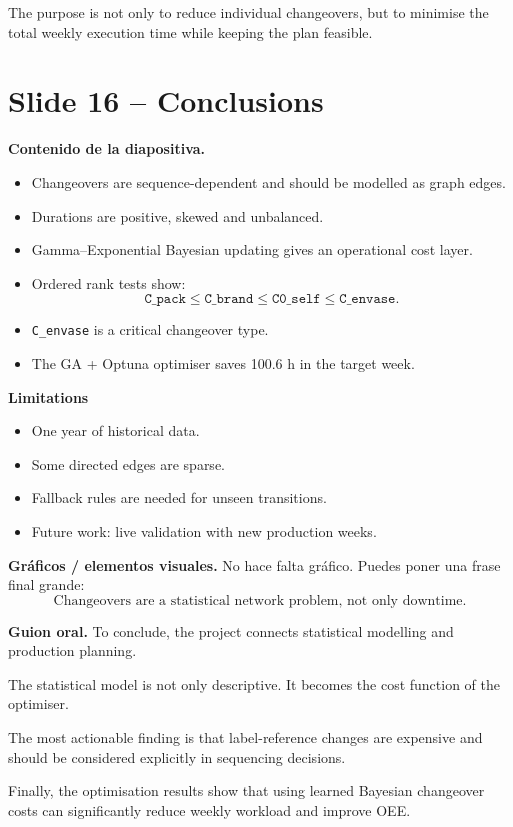 \documentclass[11pt,a4paper]{article}
\newcommand{\slide}[1]{\newpage\section*{#1}}
\newcommand{\say}{\textbf{Guion oral.} }
\newcommand{\content}{\textbf{Contenido de la diapositiva.} }
\newcommand{\figs}{\textbf{Gráficos / elementos visuales.} }
\begin{document}
The purpose is not only to reduce individual changeovers, but to minimise the
total weekly execution time while keeping the plan feasible.

\slide{Slide 16 -- Conclusions}

\content
\begin{itemize}
    \item Changeovers are sequence-dependent and should be modelled as graph edges.
    \item Durations are positive, skewed and unbalanced.
    \item Gamma--Exponential Bayesian updating gives an operational cost layer.
    \item Ordered rank tests show:
    \[
    \texttt{C\_pack}
    \leq
    \texttt{C\_brand}
    \leq
    \texttt{C0\_self}
    \leq
    \texttt{C\_envase}.
    \]
    \item \texttt{C\_envase} is a critical changeover type.
    \item The GA + Optuna optimiser saves 100.6 h in the target week.
\end{itemize}

\textbf{Limitations}
\begin{itemize}
    \item One year of historical data.
    \item Some directed edges are sparse.
    \item Fallback rules are needed for unseen transitions.
    \item Future work: live validation with new production weeks.
\end{itemize}

\figs
No hace falta gr\'afico. Puedes poner una frase final grande:
\[
\text{Changeovers are a statistical network problem, not only downtime.}
\]

\say
To conclude, the project connects statistical modelling and production planning.

The statistical model is not only descriptive. It becomes the cost function of
the optimiser.

The most actionable finding is that label-reference changes are expensive and
should be considered explicitly in sequencing decisions.

Finally, the optimisation results show that using learned Bayesian changeover
costs can significantly reduce weekly workload and improve OEE.

\newpage
\end{document}

